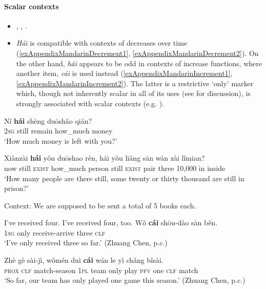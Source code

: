 \paragraph{Scalar contexts}\label{appendixMandarinScalar}
\begin{itemize}
	\item \textcite[ch. 3.2]{Alleton1972}, \textcite{Lai1999}, \textcite[312]{Wiedenhof2015}.
	\item \textit{Hái} is compatible with contexts of decreases over time (\ref{exAppendixMandarinDecrement1}, \ref{exAppendixMandarinDecrement2}). On the other hand, \textit{hái} appears to be odd in contexts of increase functions, where
another item, \textit{cái} is used instead	(\ref{exAppendixMandarinIncrement1}, \ref{exAppendixMandarinIncrement2}). The latter is a restrictive \lq only\rq{ }marker which, though not inherently scalar in all of its uses (see \cite[ch 4.1]{Hole2004} for discussion), is strongly associated with scalar contexts (e.g. \cite{Lai1999}).

\end{itemize}
\begin{exe}
	\ex\label{exAppendixMandarinDecrement1}
	\gll Nǐ	\textbf{hái}	shèng		duōshǎo	qián?\\
	2\textsc{sg} still remain how\_much money\\
	\glt \lq How much money is left with you?' \parencite[219]{Shi2016}
	
	\ex\label{exAppendixMandarinDecrement2}
	\gll Xiànzài \textbf{hái} yǒu duōshao rén, hái yǒu liǎng sān wàn zài lǐmian?\\
	now still \textsc{exist} how\_much person still \textsc{exist} pair three 10,000 in  inside\\
	\glt \lq How many people are there still, some twenty or thirty thousand are still in prison?' \parencite[279]{Wiedenhof2015}

	\ex\label{exAppendixMandarinIncrement1}
	Context: We are supposed to be sent a total of 5 books each.
	\begin{xlist}
		 I've received four.
		 I've received four, too.
			\gll Wǒ	\textbf{cái}	shōu-dào	sān	běn.\\
		1\textsc{sg} only receive-arrive three \textsc{clf}\\
		\glt \lq I've only received three so far.\rq{ }(Zhuang Chen, p.c.)
	\end{xlist}

	\ex\label{exAppendixMandarinIncrement2}
	\gll Zhè	gè sài-jì,	wǒmén duì	\textbf{cái}	wán	le	yì	chǎng	bǐsài.\\
	\textsc{prox} \textsc{clf} match-season 1\textsc{pl} team only play \textsc{pfv} one \textsc{clf} match\\
	\glt \lq So far, our team has only played one game this season.\rq{ }(Zhuang Chen, p.c.)
\end{exe}


